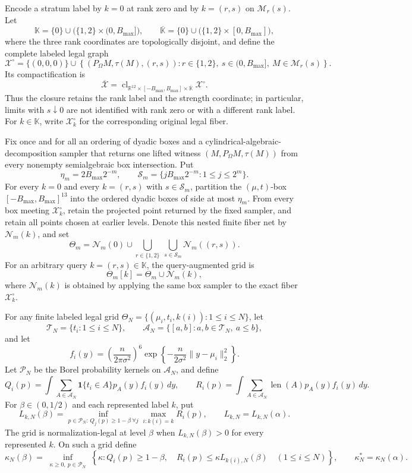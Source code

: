Encode a stratum label by \(k=0\) at rank zero and by \(k=(r,s)\) on \(\mathcal M_r(s)\).  Let
\[
 \mathbb K=\{0\}\cup\bigl(\{1,2\}\times(0,B_{\max}]\bigr),
 \qquad
 \overline{\mathbb K}=\{0\}\cup\bigl(\{1,2\}\times[0,B_{\max}]\bigr),
\]
where the three rank coordinates are topologically disjoint, and define the complete labeled legal graph
\[
 \mathcal X^\circ
 =\{(0,0,0)\}\cup
 \left\{(P_\Omega M,\tau(M),(r,s)):
 r\in\{1,2\},\ s\in(0,B_{\max}],\ M\in\mathcal M_r(s)\right\}.
\]
Its compactification is
\[
 \overline{\mathcal X}=\operatorname{cl}_{\mathbb R^{12}\times[-B_{\max},B_{\max}]\times\overline{\mathbb K}}
 \mathcal X^\circ.
\]
Thus the closure retains the rank label and the strength coordinate; in particular, limits with \(s\downarrow0\) are not identified with rank zero or with a different rank label.  For \(k\in\mathbb K\), write \(\mathcal X_k^\circ\) for the corresponding original legal fiber.

Fix once and for all an ordering of dyadic boxes and a cylindrical-algebraic-decomposition sampler that returns one lifted witness \((M,P_\Omega M,\tau(M))\) from every nonempty semialgebraic box intersection.  Put
\[
 \eta_m=2B_{\max}2^{-m},
 \qquad
 \mathcal S_m=\{jB_{\max}2^{-m}:1\leq j\leq2^m\}.
\]
For every \(k=0\) and every \(k=(r,s)\) with \(s\in\mathcal S_m\), partition the \((\mu,t)\)-box \([-B_{\max},B_{\max}]^{13}\) into the ordered dyadic boxes of side at most \(\eta_m\).  From every box meeting \(\mathcal X_k^\circ\), retain the projected point returned by the fixed sampler, and retain all points chosen at earlier levels.  Denote this nested finite fiber net by \(\mathcal N_m(k)\), and set
\[
 \Theta_m=\mathcal N_m(0)\cup
 \bigcup_{r\in\{1,2\}}\ \bigcup_{s\in\mathcal S_m}\mathcal N_m((r,s)).
\]
For an arbitrary query \(k=(r,s)\in\mathbb K\), the query-augmented grid is
\[
 \Theta_m[k]=\Theta_m\cup\mathcal N_m(k),
\]
where \(\mathcal N_m(k)\) is obtained by applying the same box sampler to the exact fiber \(\mathcal X_k^\circ\).

For any finite labeled legal grid \(\Theta_N=\{(\mu_i,t_i,k(i)):1\leq i\leq N\}\), let
\[
 \mathcal T_N=\{t_i:1\leq i\leq N\},
 \qquad
 \mathcal A_N=\{[a,b]:a,b\in\mathcal T_N,\ a\leq b\},
\]
and let
\[
 f_i(y)=\left(\frac{n}{2\pi\sigma^2}\right)^6
 \exp\!\left\{-\frac{n}{2\sigma^2}\lVert y-\mu_i\rVert_2^2\right\}.
\]
Let \(\mathcal P_N\) be the Borel probability kernels on \(\mathcal A_N\), and define
\[
 Q_i(p)=\int\sum_{A\in\mathcal A_N}\mathbf1\{t_i\in A\}p_A(y)f_i(y)\,dy,
 \qquad
 R_i(p)=\int\sum_{A\in\mathcal A_N}\operatorname{len}(A)p_A(y)f_i(y)\,dy.
\]
For \(\beta\in(0,1/2)\) and each represented label \(k\), put
\[
 L_{k,N}(\beta)=
 \inf_{p\in\mathcal P_N:\,Q_j(p)\geq1-\beta\ \forall j}
 \max_{i:k(i)=k}R_i(p),
 \qquad L_{k,N}=L_{k,N}(\alpha).
\]
The grid is normalization-legal at level \(\beta\) when \(L_{k,N}(\beta)>0\) for every represented \(k\).  On such a grid define
\[
 \kappa_N(\beta)=\inf_{\substack{\kappa\geq0,\ p\in\mathcal P_N}}
 \left\{\kappa:Q_i(p)\geq1-\beta,\quad
 R_i(p)\leq\kappa L_{k(i),N}(\beta)\quad(1\leq i\leq N)\right\},
 \qquad \kappa_N^*=\kappa_N(\alpha).
\]

